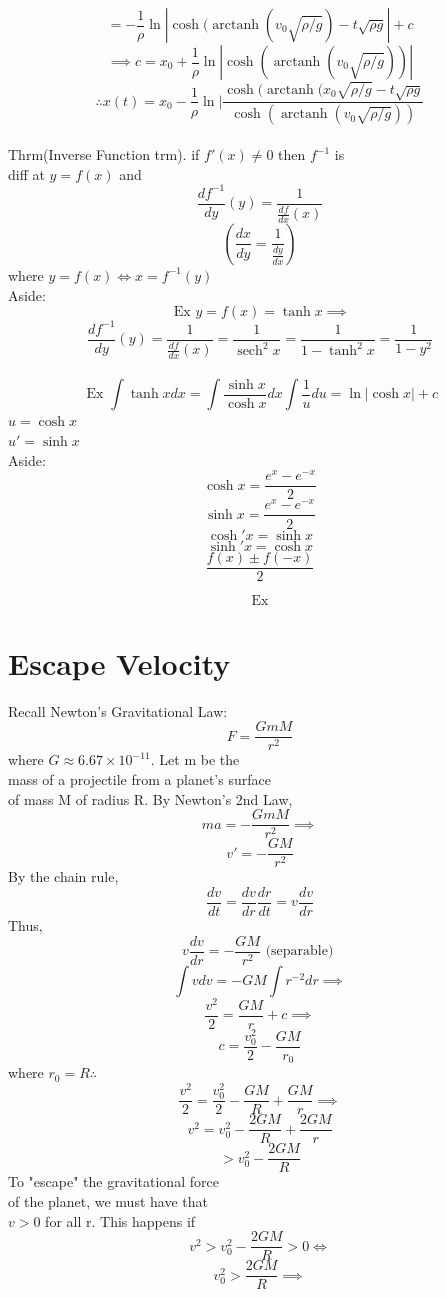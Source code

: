 \documentclass[10pt,a4paper]{article}
\DeclareMathOperator\arctanh{arctanh}
\DeclareMathOperator\sech{sech}
\theoremstyle{definition}
\begin{document}
  \[ = -\frac{1}{\rho} \ln | \cosh ( \arctanh (v_0 \sqrt{\rho/g}) - t
  \sqrt{\rho g}| + c \]
  \[ \implies c = x_0 + \frac{1}{\rho} \ln | \cosh ( \arctanh (v_0
  \sqrt{\rho/g}))| \]
  \[ \therefore \boxed{ x(t) = x_0 - \frac{1}{\rho} \ln | \frac{\cosh
  (\arctanh (x_0 \sqrt{\rho/g} -t \sqrt{\rho g}}{ \cosh( \arctanh (v_0
  \sqrt{\rho/g}))}} \]
  \\[5mm]
  Thrm(Inverse Function trm). if \( f'(x) \neq 0 \) then \( f^{-1}\) is \\
  diff at \( y= f(x) \) and 
  \[ \frac{df^{-1}}{dy}(y) = \frac{1}{ \frac{df}{dx} (x) } \]
  \[ ( \frac{dx}{dy} = \frac{1}{ \frac{dy}{dx}}) \]
  where \( y = f(x) \iff x = f^{-1}(y) \) \\[5mm]
  Aside:
  \[ \text{ Ex } y = f(x) = \tanh x \implies \]
  \[ \frac{df^{-1}}{dy}(y) = \frac{1}{ \frac{df}{dx}(x)} =
  \frac{1}{\sech^2 x} = \frac{1}{1-\tanh^2 x} = \frac{1}{1-y^2} \]
  \\[5mm]
  \[ \text{ Ex } \int \tanh x dx = \int \frac{\sinh x}{\cosh x}dx \int
  \frac{1}{u} du = \ln|\cosh x | + c \]
  \( u = \cosh x \) \\
  \( u' = \sinh x \) \\[5mm]
  Aside: 
  \[ \cosh x = \frac{e^x - e^{-x} }{2} \]
  \[ \sinh x =\frac{e^x - e^{-x} }{2}  \]
  \[ \cosh'x = \sinh x \]
  \[ \sinh'x = \cosh x \]
  \[ \frac{f(x) \pm f(-x)}{2} \]

  \[ \text{ Ex }  \]


  \newpage
\section*{Escape Velocity}
  Recall Newton's Gravitational Law:
  \[ F = \frac{GmM}{r^2} \]
  where \( G \approx 6.67 \times 10^{-11}\). Let m be the \\
  mass of a projectile from a planet's surface \\
  of mass M of radius R. By 
  Newton's 2nd Law, 
  \[ ma = -\frac{GmM}{r^2} \implies \]
  \[ v' = -\frac{GM}{r^2} \]
  By the chain rule, 
  \[ \frac{dv}{dt} = \frac{dv}{dr} \frac{dr}{dt} = v \frac{dv}{dr} \]
  Thus, 
  \[ v \frac{dv}{dr} = -\frac{GM}{r^2} \text{ (separable) } \]
  \[ \int v dv = -GM \int r^{-2} dr \implies \]
  \[ \frac{v^2}{2} =  \frac{GM}{r} + c \implies \]
  \[ c = \frac{v_0^2}{2} - \frac{GM}{r_0} \]
  where \( r_0 = R \therefore \)
  \[ \frac{v^2}{2} = \frac{v_0^2}{2} - \frac{GM}{R} + \frac{GM}{r}
  \implies \]
  \[ v^2 = v_0^2 - \frac{2GM}{R} + \frac{2GM}{r} \]
  \[ > v_0^2 - \frac{2GM}{R} \]
  To "escape" the gravitational force \\
  of the planet, we must have that \\
  \( v>0 \) for all r. This happens if 
  \[ v^2 > v_0^2 - \frac{2GM}{R} > 0 \iff \]
  \[ v_0^2 > \frac{2GM}{R} \implies \]
\end{document}
